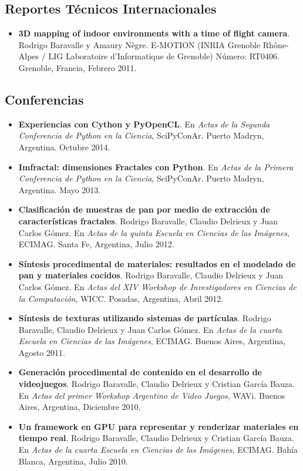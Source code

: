 \documentclass[a4paper,12pt]{article}
\begin{document}
\subsection*{\color{niceblue} Reportes Técnicos Internacionales}
\begin{itemize}
\item {\bf 3D mapping of indoor environments with a time of flight camera}. Rodrigo Baravalle y Amaury N\`egre. E-MOTION (INRIA Grenoble Rh\^one-Alpes / LIG Laboratoire d'Informatique de Grenoble) Número: RT0406. Grenoble, Francia, Febrero 2011.
\end{itemize}

\subsection*{\color{niceblue} Conferencias}
\begin{itemize}
\item {\bf Experiencias con Cython y PyOpenCL}. En {\it Actas de la Segunda Conferencia de Python en la Ciencia}, SciPyConAr. Puerto Madryn, Argentina. Octubre 2014.
\item {\bf Imfractal: dimensiones Fractales con Python}.  En {\it Actas de la Primera Conferencia de Python en la Ciencia}, SciPyConAr. Puerto Madryn, Argentina. Mayo 2013.
\item {\bf Clasificación de muestras de pan por medio de extracción de características fractales}. Rodrigo Baravalle, Claudio Delrieux y Juan Carlos G\'omez. En {\it Actas de la quinta Escuela en Ciencias de las Imágenes}, ECIMAG. Santa Fe, Argentina, Julio 2012.
\item {\bf Síntesis procedimental de materiales: resultados en el modelado de pan y materiales cocidos}. Rodrigo Baravalle, Claudio Delrieux y Juan Carlos G\'omez. En {\it Actas del XIV Workshop de Investigadores en Ciencias de la Computación}, WICC. Posadas, Argentina, Abril 2012.
\item {\bf Síntesis de texturas utilizando sistemas de partículas}. Rodrigo Baravalle, Claudio Delrieux y Juan Carlos G\'omez. En {\it Actas de la cuarta Escuela en Ciencias de las Imágenes}, ECIMAG. Buenos Aires, Argentina, Agosto 2011.
\item {\bf Generación procedimental de contenido en el desarrollo de videojuegos}. Rodrigo Baravalle, Claudio Delrieux y Cristian Garc\'ia Bauza. En {\it Actas del primer Workshop Argentino de Video Juegos}, WAVi. Buenos Aires, Argentina, Diciembre 2010.
\item {\bf Un framework en GPU para representar y renderizar materiales en tiempo real}. Rodrigo Baravalle, Claudio Delrieux y Cristian Garc\'ia Bauza. En {\it Actas de la cuarta Escuela en Ciencias de las Imágenes}, ECIMAG. Bahía Blanca, Argentina, Julio 2010.
\end{itemize}
\end{document}
